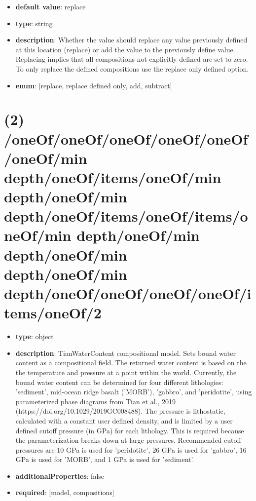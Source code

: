 \begin{itemize}[leftmargin=3em]\item {\bf default value}: replace
\item {\bf type}: string
\item {\bf description}: Whether the value should replace any value previously defined at this location (replace) or add the value to the previously define value. Replacing implies that all compositions not explicitly defined are set to zero. To only replace the defined compositions use the replace only defined option.
\item {\bf enum}: [replace, replace defined only, add, subtract]\end{itemize}\section{(2) /oneOf/oneOf/oneOf/oneOf/oneOf/oneOf/min depth/oneOf/items/oneOf/min depth/oneOf/min depth/oneOf/items/oneOf/items/oneOf/min depth/oneOf/min depth/oneOf/min depth/oneOf/min depth/oneOf/oneOf/oneOf/oneOf/items/oneOf/2}
\begin{itemize}[leftmargin=2em]\item {\bf type}: object
\item {\bf description}: TianWaterContent compositional model. Sets bound water content as a compositional field. The returned water content is based on the the temperature and pressure at a point within the world. Currently, the bound water content can be determined for four different lithologies: 'sediment', mid-ocean ridge basalt ('MORB'), 'gabbro', and 'peridotite', using parameterized phase diagrams from Tian et al., 2019 (https://doi.org/10.1029/2019GC008488). The pressure is lithostatic, calculated with a constant user defined density, and is limited by a user defined cutoff pressure (in GPa) for each lithology. This is required because the parameterization breaks down at large pressures. Recommended cutoff pressures are 10 GPa is used for 'peridotite', 26 GPa is used for 'gabbro', 16 GPa is used for 'MORB', and 1 GPa is used for 'sediment'.
\item {\bf additionalProperties}: false
\item {\bf required}: [model, compositions]\end{itemize}
